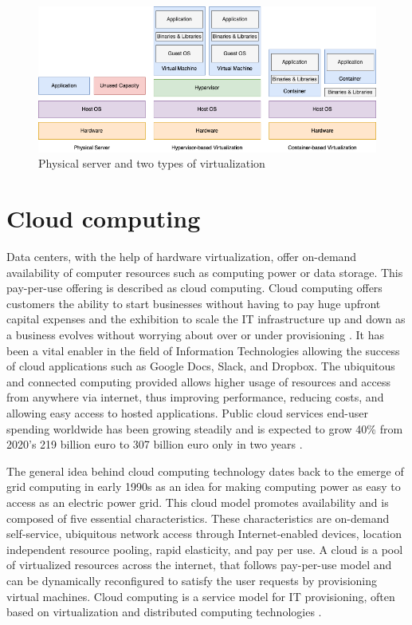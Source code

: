 \begin{figure}[ht]
  \begin{center}
    \includegraphics[width=13.5cm]{images/VirtualizationTypes.png}
    \caption{Physical server and two types of virtualization}
    \label{fig:VirtualizationTypes}
  \end{center}
\end{figure}

\section{Cloud computing}

Data centers, with the help of hardware virtualization, offer on-demand availability of computer resources such as computing power or data storage. This pay-per-use offering is described as cloud computing. Cloud computing offers customers the ability to start businesses without having to pay huge upfront capital expenses and the exhibition to scale the IT infrastructure up and down as a business evolves without worrying about over or under provisioning \cite{Xing2012}. It has been a vital enabler in the field of Information Technologies allowing the success of cloud applications such as Google Docs, Slack, and Dropbox. The ubiquitous and connected computing provided allows higher usage of resources and access from anywhere via internet, thus improving performance, reducing costs, and allowing easy access to hosted applications. Public cloud services end-user spending worldwide has been growing steadily and is expected to grow 40\% from 2020's 219 billion euro to 307 billion euro only in two years \cite{PublicCloudStatista}.

The general idea behind cloud computing technology dates back to the emerge of grid computing in early 1990s as an idea for making computing power as easy to access as an electric power grid. This cloud model promotes availability and is composed of five essential characteristics. These characteristics are on-demand self-service, ubiquitous network access through Internet-enabled devices, location independent resource pooling, rapid elasticity, and pay per use. A cloud is a pool of virtualized resources across the internet, that follows pay-per-use model and can be dynamically reconfigured to satisfy the user requests by provisioning virtual machines. Cloud computing is a service model for IT provisioning, often based on virtualization and distributed computing technologies \cite{Lombardi2011}. \cite{Xing2012}

